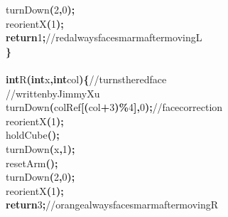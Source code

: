 \documentclass[a4paper, 10pt]{article}
\newcommand\SPC{\hspace*{0.6em}}
\newcommand\TAB{\hspace*{1.2em}}
\newcommand\HYP{\mbox{\char 45}}
\newcommand{\CppAComment}[1]{\textcolor[rgb]{0,0.5,0}{\colorbox[rgb]{1,1,1}{#1}}}
\newcommand{\CppAIdentifier}[1]{#1}
\newcommand{\CppANumber}[1]{\textcolor[rgb]{0,0,1}{\colorbox[rgb]{1,1,1}{#1}}}
\newcommand{\CppAReservedWord}[1]{\textbf{\colorbox[rgb]{1,1,1}{#1}}}
\newcommand{\CppASpace}[1]{\colorbox[rgb]{1,1,1}{#1}}
\newcommand{\CppASymbol}[1]{\textbf{\textcolor[rgb]{1,0,0}{\colorbox[rgb]{1,1,1}{#1}}}}
\begin{document}
\begin{ttfamily}
\CppASpace{\TAB }\CppAIdentifier{turnDown}\CppASymbol{(}\CppANumber{2}\CppASymbol{,}\CppANumber{0}\CppASymbol{)}\CppASymbol{;}\\
\CppASpace{\TAB }\CppAIdentifier{reorientX}\CppASymbol{(}\CppANumber{1}\CppASymbol{)}\CppASymbol{;}\\
\CppASpace{\TAB }\CppAReservedWord{return}\CppASpace{\SPC }\CppANumber{1}\CppASymbol{;}\CppASpace{\SPC }\CppAComment{//\SPC red\SPC always\SPC faces\SPC marm\SPC after\SPC moving\SPC L}\\
\CppASymbol{\}}\\
\\
\CppAReservedWord{int}\CppASpace{\SPC }\CppAIdentifier{R}\CppASymbol{(}\CppAReservedWord{int}\CppASpace{\SPC }\CppAIdentifier{x}\CppASymbol{,}\CppASpace{\SPC }\CppAReservedWord{int}\CppASpace{\SPC }\CppAIdentifier{col}\CppASymbol{)}\CppASymbol{\{}\CppASpace{\SPC }\CppAComment{//\SPC turns\SPC the\SPC red\SPC face}\\
\CppASpace{\TAB }\CppAComment{//\SPC written\SPC by\SPC Jimmy\SPC Xu}\\
\CppASpace{\TAB }\CppAIdentifier{turnDown}\CppASymbol{(}\CppAIdentifier{colRef}\CppASymbol{[}\CppASymbol{(}\CppAIdentifier{col}\CppASymbol{+}\CppANumber{3}\CppASymbol{)}\CppASymbol{\%}\CppANumber{4}\CppASymbol{]}\CppASymbol{,}\CppANumber{0}\CppASymbol{)}\CppASymbol{;}\CppASpace{\SPC }\CppAComment{//\SPC face\SPC correction}\\
\CppASpace{\TAB }\CppAIdentifier{reorientX}\CppASymbol{(}\CppANumber{1}\CppASymbol{)}\CppASymbol{;}\\
\CppASpace{\TAB }\CppAIdentifier{holdCube}\CppASymbol{(}\CppASymbol{)}\CppASymbol{;}\\
\CppASpace{\TAB }\CppAIdentifier{turnDown}\CppASymbol{(}\CppAIdentifier{x}\CppASymbol{,}\CppANumber{1}\CppASymbol{)}\CppASymbol{;}\\
\CppASpace{\TAB }\CppAIdentifier{resetArm}\CppASymbol{(}\CppASymbol{)}\CppASymbol{;}\\
\CppASpace{\TAB }\CppAIdentifier{turnDown}\CppASymbol{(}\CppASymbol{\HYP }\CppANumber{2}\CppASymbol{,}\CppANumber{0}\CppASymbol{)}\CppASymbol{;}\\
\CppASpace{\TAB }\CppAIdentifier{reorientX}\CppASymbol{(}\CppANumber{1}\CppASymbol{)}\CppASymbol{;}\\
\CppASpace{\TAB }\CppAReservedWord{return}\CppASpace{\SPC }\CppANumber{3}\CppASymbol{;}\CppASpace{\SPC }\CppAComment{//\SPC orange\SPC always\SPC faces\SPC marm\SPC after\SPC moving\SPC R}\\

\end{ttfamily}
\end{document}
